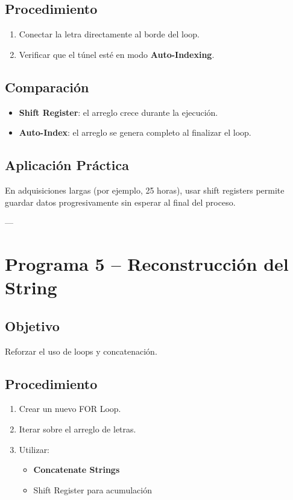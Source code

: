 \documentclass[12pt]{article}
\begin{document}
\subsection*{Procedimiento}

\begin{enumerate}
    \item Conectar la letra directamente al borde del loop.
    \item Verificar que el túnel esté en modo \textbf{Auto-Indexing}.
\end{enumerate}

\subsection*{Comparación}

\begin{itemize}
    \item \textbf{Shift Register}: el arreglo crece durante la ejecución.
    \item \textbf{Auto-Index}: el arreglo se genera completo al finalizar el loop.
\end{itemize}

\subsection*{Aplicación Práctica}

En adquisiciones largas (por ejemplo, 25 horas), usar shift registers permite guardar datos progresivamente sin esperar al final del proceso.

---

\section{Programa 5 – Reconstrucción del String}

\subsection*{Objetivo}
Reforzar el uso de loops y concatenación.

\subsection*{Procedimiento}

\begin{enumerate}
    \item Crear un nuevo FOR Loop.
    \item Iterar sobre el arreglo de letras.
    \item Utilizar:
    \begin{itemize}
        \item \textbf{Concatenate Strings}
        \item Shift Register para acumulación
    \end{itemize}
\end{enumerate}
\end{document}
